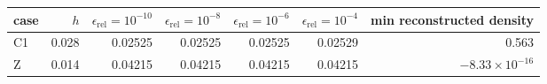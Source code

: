 \begin{tabular}{lrrrrrr}
\toprule
case & $h$ & $\epsilon_{\mathrm{rel}}=10^{-10}$ & $\epsilon_{\mathrm{rel}}=10^{-8}$ & $\epsilon_{\mathrm{rel}}=10^{-6}$ & $\epsilon_{\mathrm{rel}}=10^{-4}$ & min reconstructed density \\
\midrule
C1 & 0.028 & 0.02525 & 0.02525 & 0.02525 & 0.02529 & 0.563 \\
Z & 0.014 & 0.04215 & 0.04215 & 0.04215 & 0.04215 & $-8.33\times10^{-16}$ \\
\bottomrule
\end{tabular}

